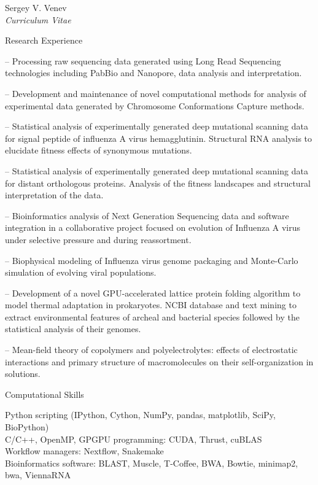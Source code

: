 \documentclass[10pt]{article}
\newenvironment{sublist}{%
    \begin{list}{}{%
        \setlength{\itemsep}{0em}\setlength{\parsep}{0em}%
        \setlength{\topsep}{0em}\setlength{\parskip}{0em}%
    }%
}%
{ \end{list} }
\begin{document}
\begin{cv}{Sergey V. Venev\\{\large \itshape Curriculum Vitae}}
\setlength{\oldcvlabelwidth}{\cvlabelwidth}
\setlength{\cvlabelwidth}{1em}
\begin{cvlist}{Research Experience}
    \item[--] Processing raw sequencing data generated using Long Read Sequencing technologies including PabBio and Nanopore, data analysis and interpretation.
    \item[--] Development and maintenance of novel computational methods for analysis of experimental data generated by Chromosome Conformations Capture methods.
    \item[--] Statistical analysis of experimentally generated deep mutational scanning data for signal peptide of influenza A virus hemagglutinin. Structural RNA analysis to elucidate fitness effects of synonymous mutations.
    \item[--] Statistical analysis of experimentally generated deep mutational scanning data for distant orthologous proteins. Analysis of the fitness landscapes and structural interpretation of the data.
    \item[--] Bioinformatics analysis of Next Generation Sequencing data and software integration in a collaborative project focused on evolution of Influenza A virus under selective pressure and during reassortment.
    \item[--] Biophysical modeling of Influenza virus genome packaging and Monte-Carlo simulation of evolving viral populations.
    \item[--] Development of a novel GPU-accelerated lattice protein folding algorithm to model thermal adaptation in prokaryotes. NCBI database and text mining to extract environmental features of archeal and bacterial species followed by the statistical analysis of their genomes.
    \item[--] Mean-field theory of copolymers and polyelectrolytes: effects of electrostatic interactions and primary structure of macromolecules on their self-organization in solutions.

\end{cvlist}
\setlength{\cvlabelwidth}{\oldcvlabelwidth}



\setlength{\oldcvlabelwidth}{\cvlabelwidth}
\setlength{\cvlabelwidth}{1em}
\begin{cvlist}{Computational Skills}
        \item Python scripting (IPython, Cython, NumPy, pandas, matplotlib, SciPy, BioPython)\\
        C/C++, OpenMP, GPGPU programming: CUDA, Thrust, cuBLAS\\
        Workflow managers: Nextflow, Snakemake\\
        Bioinformatics software: BLAST, Muscle, T-Coffee, BWA, Bowtie, minimap2, bwa, ViennaRNA
\end{cvlist}
\setlength{\cvlabelwidth}{\oldcvlabelwidth}





\end{cv}
\end{document}
